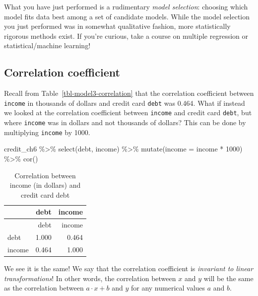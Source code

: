\documentclass[
  letterpaper,
  DIV=11,
  numbers=noendperiod]{scrreprt}
\newenvironment{Shaded}{\begin{snugshade}}{\end{snugshade}}
\newcommand{\AttributeTok}[1]{\textcolor[rgb]{0.40,0.45,0.13}{#1}}
\newcommand{\DecValTok}[1]{\textcolor[rgb]{0.68,0.00,0.00}{#1}}
\newcommand{\FunctionTok}[1]{\textcolor[rgb]{0.28,0.35,0.67}{#1}}
\newcommand{\NormalTok}[1]{\textcolor[rgb]{0.00,0.23,0.31}{#1}}
\newcommand{\SpecialCharTok}[1]{\textcolor[rgb]{0.37,0.37,0.37}{#1}}
\theoremstyle{definition}
\theoremstyle{remark}
\begin{document}
What you have just performed is a rudimentary \emph{model
selection}: choosing which model fits data best
among a set of candidate models. While the model selection you just
performed was in somewhat qualitative fashion, more statistically
rigorous methods exist. If you're curious, take a course on multiple
regression or statistical/machine learning!

\hypertarget{sec-correlationcoefficient2}{%
\subsection{Correlation coefficient}\label{sec-correlationcoefficient2}}

Recall from Table~\ref{tbl-model3-correlation} that the correlation
coefficient between \texttt{income} in
thousands of dollars and credit card \texttt{debt} was 0.464. What if
instead we looked at the correlation coefficient between \texttt{income}
and credit card \texttt{debt}, but where \texttt{income} was in dollars
and not thousands of dollars? This can be done by multiplying
\texttt{income} by 1000.

\begin{Shaded}
\begin{Highlighting}[]
\NormalTok{credit\_ch6 }\SpecialCharTok{\%\textgreater{}\%} 
  \FunctionTok{select}\NormalTok{(debt, income) }\SpecialCharTok{\%\textgreater{}\%} 
  \FunctionTok{mutate}\NormalTok{(}\AttributeTok{income =}\NormalTok{ income }\SpecialCharTok{*} \DecValTok{1000}\NormalTok{) }\SpecialCharTok{\%\textgreater{}\%} 
  \FunctionTok{cor}\NormalTok{()}
\end{Highlighting}
\end{Shaded}

\hypertarget{tbl-cor-credit-2}{}
\begin{longtable}[]{@{}lrr@{}}
\caption{\label{tbl-cor-credit-2}Correlation between income (in dollars)
and credit card debt}\tabularnewline
\toprule\noalign{}
& debt & income \\
\midrule\noalign{}
\endfirsthead
\toprule\noalign{}
& debt & income \\
\midrule\noalign{}
\endhead
\bottomrule\noalign{}
\endlastfoot
debt & 1.000 & 0.464 \\
income & 0.464 & 1.000 \\
\end{longtable}

We see it is the same! We say that the correlation coefficient is
\emph{invariant to linear transformations}! In other words, the
correlation between \(x\) and \(y\) will be the same as the correlation
between \(a\cdot x + b\) and \(y\) for any numerical values \(a\) and
\(b\).
\end{document}
